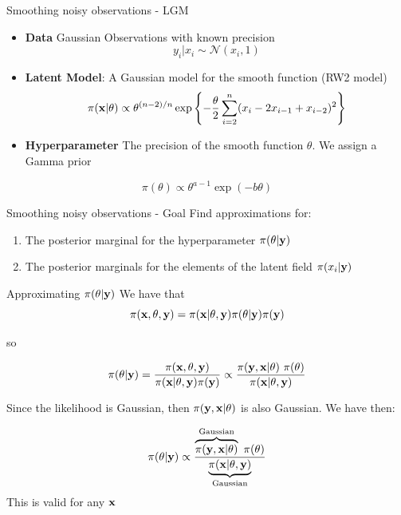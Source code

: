 \documentclass[
  ignorenonframetext,
]{beamer}
\providecommand{\tightlist}{%
  \setlength{\itemsep}{0pt}\setlength{\parskip}{0pt}}
\begin{document}
\begin{frame}{Smoothing noisy observations - LGM}
\protect\hypertarget{smoothing-noisy-observations---lgm}{}
\begin{itemize}
\item
  \textbf{Data} Gaussian Observations with known precision \[
    y_i|x_i\sim\mathcal{N}(x_i,1)
  \]
\item
  \textbf{Latent Model}: A Gaussian model for the smooth function (RW2
  model) \[
    \pi({\bf x}|\theta)\propto \theta^{(n-2)/n}\exp\left\{
    -\frac{\theta}{2}\sum_{i=2}^n(x_i-2x_{i-1}+x_{i-2})^2
    \right\}
  \]
\item
  \textbf{Hyperparameter} The precision of the smooth function
  \(\theta\). We assign a Gamma prior
\end{itemize}

\[
    \pi(\theta)\propto\theta^{a-1}\exp(-b\theta)
\]
\end{frame}

\begin{frame}{Smoothing noisy observations - Goal}
\protect\hypertarget{smoothing-noisy-observations---goal}{}
Find approximations for:

\begin{enumerate}
\tightlist
\item
  The posterior marginal for the hyperparameter \(\pi(\theta|\bf{y})\)
\item
  The posterior marginals for the elements of the latent field
  \(\pi(x_i|\bf{y})\)
\end{enumerate}
\end{frame}

\begin{frame}{Approximating \(\pi(\theta|\bf{y})\)}
\protect\hypertarget{approximating-pithetabfy}{}
We have that \[
    \pi(\bf{x},\theta,\bf{y}) = \pi(\bf{x}|\theta,\bf{y})\pi(\theta|\bf{y})\pi(\bf{y})
\]

so

\[
    \pi(\theta|\bf{y}) = \frac{\pi(\bf{x},\theta,\bf{y})}{\pi(\bf{x}|\theta,\bf{y})\pi(\bf{y})} \propto\frac{
  \pi(\bf{y}, \bf{x}|\theta)\  \pi(\theta)
    }{\pi(\bf{x}|\theta,\bf{y})}
\]

Since the likelihood is Gaussian, then \(\pi(\bf{y}, \bf{x}|\theta)\) is
also Gaussian. We have then:

\[
   \pi(\theta|\bf{y})  \propto \frac{
  \overbrace{\pi(\bf{y}, \bf{x}|\theta)}^{\text{Gaussian}}\  \pi(\theta)}
  {\underbrace{\pi(\bf{x}|\theta,\bf{y})}_{\text{Gaussian}}}
\] This is valid for any \(\bf{x}\)
\end{frame}
\end{document}
